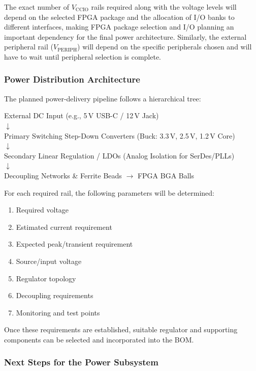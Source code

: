 \documentclass[12pt,a4paper]{article}
\begin{document}
The exact number of $V_{\text{CCIO}}$ rails required along with the voltage levels will depend on the selected FPGA package and the allocation of I/O banks to different interfaces, making FPGA package selection and I/O planning an important dependency for the final power architecture. Similarly, the external peripheral rail ($V_{\text{PERIPH}}$) will depend on the specific peripherals chosen and will have to wait until peripheral selection is complete.

\subsubsection{Power Distribution Architecture}
The planned power-delivery pipeline follows a hierarchical tree:
\begin{center}
External DC Input (e.g., 5\,V USB-C / 12\,V Jack)\\
$\downarrow$\\
Primary Switching Step-Down Converters (Buck: 3.3\,V, 2.5\,V, 1.2\,V Core)\\
$\downarrow$\\
Secondary Linear Regulation / LDOs (Analog Isolation for SerDes/PLLs)\\
$\downarrow$\\
Decoupling Networks \& Ferrite Beads $\rightarrow$ FPGA BGA Balls
\end{center}

For each required rail, the following parameters will be determined:
\begin{enumerate}[leftmargin=1.5cm]
    \item Required voltage
    \item Estimated current requirement
    \item Expected peak/transient requirement
    \item Source/input voltage
    \item Regulator topology
    \item Decoupling requirements
    \item Monitoring and test points
\end{enumerate}

Once these requirements are established, suitable regulator and supporting components can be selected and incorporated into the BOM.

\subsubsection{Next Steps for the Power Subsystem}
\end{document}
